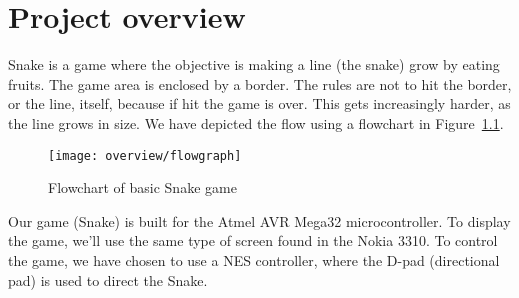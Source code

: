 \chapter{Project overview}

Snake is a game where the objective is making a line (the snake) grow by eating fruits. The game area is enclosed by a border. The rules are not to hit the border, or the line, itself, because if hit the game is over. This gets increasingly harder, as the line grows in size. We have depicted the flow using a flowchart in Figure~\ref{fig:flow}.

\begin{figure}
\centering
\texttt{[image: overview/flowgraph]}
\caption{Flowchart of basic Snake game}
\label{fig:flow}
\end{figure}

Our game (Snake) is built for the Atmel AVR Mega32 microcontroller. To display the game, we'll use the same type of screen found in the Nokia 3310. To control the game, we have chosen to use a NES controller, where the D-pad (directional pad) is used to direct the Snake.
